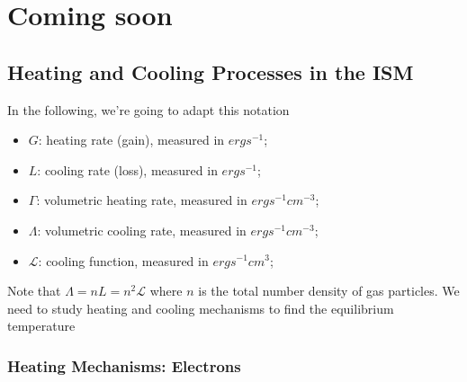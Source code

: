 \chapter{Coming soon}

\section{Heating and Cooling Processes in the ISM}

In the following, we're going to adapt this notation
\begin{itemize}
    \item $G$: heating rate (gain), measured in $\unit{erg}\unit{s}^{-1}$;
    \item $L$: cooling rate (loss), measured in $\unit{erg}\unit{s}^{-1}$;
    \item $\Gamma$: volumetric heating rate, measured in $\unit{erg}\unit{s}^{-1}\unit{cm}^{-3}$;
    \item $\Lambda$: volumetric cooling rate, measured in $\unit{erg}\unit{s}^{-1}\unit{cm}^{-3}$;
    \item $\mathcal{L}$: cooling function, measured in $\unit{erg}\unit{s}^{-1}\unit{cm}^{3}$;
\end{itemize}
Note that $\Lambda = nL = n^{2}\mathcal{L}$ where $n$ is the total number density of gas particles. We need to study heating and cooling mechanisms to find the equilibrium temperature

\subsection{Heating Mechanisms: Electrons}

